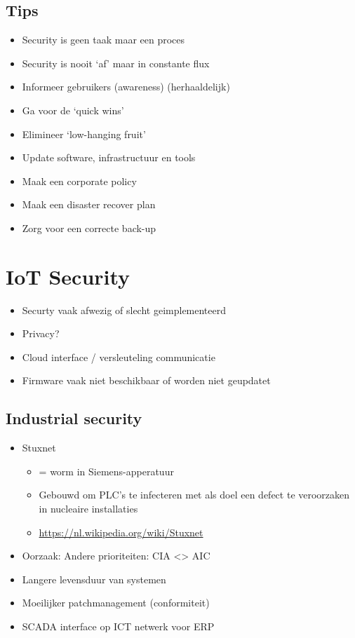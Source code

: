 \documentclass{article}
\begin{document}
\subsection{Tips}

\begin{itemize}
    \item Security is geen taak maar een proces
    \item Security is nooit `af' maar in constante flux
    \item Informeer gebruikers (awareness) (herhaaldelijk)
    \item Ga voor de `quick wins'
    \item Elimineer `low-hanging fruit'
    \item Update software, infrastructuur en tools
    \item Maak een corporate policy
    \item Maak een disaster recover plan
    \item Zorg voor een correcte back-up
\end{itemize}

\section{IoT Security}

\begin{itemize}
    \item Securty vaak afwezig of slecht geimplementeerd
    \item Privacy?
    \item Cloud interface / versleuteling communicatie
    \item Firmware vaak niet beschikbaar of worden niet geupdatet
\end{itemize}

\subsection{Industrial security}

\begin{itemize}
    \item Stuxnet 
    \begin{itemize}
        \item = worm in Siemens-apperatuur
        \item Gebouwd om PLC's te infecteren met als doel een defect te veroorzaken in nucleaire installaties
        \item \url{https://nl.wikipedia.org/wiki/Stuxnet}
    \end{itemize}
    \item Oorzaak: Andere prioriteiten: CIA <> AIC
    \item Langere levensduur van systemen
    \item Moeilijker patchmanagement (conformiteit)
    \item SCADA interface op ICT netwerk voor ERP
\end{itemize}
\end{document}

